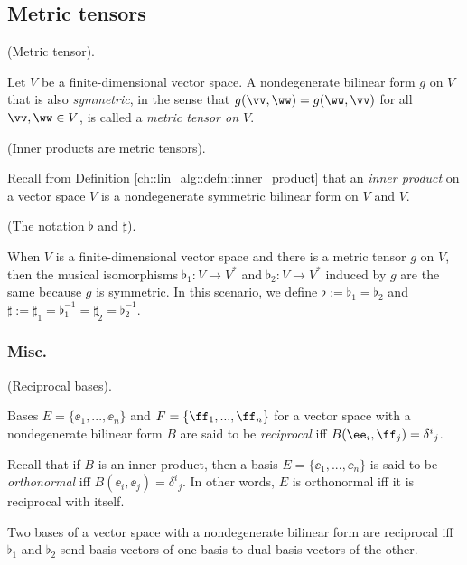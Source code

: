 \subsection*{Metric tensors}

\begin{defn}
    (Metric tensor).
    
    Let $V$ be a finite-dimensional vector space. A nondegenerate bilinear form $g$ on $V$ that is also \textit{symmetric}, in the sense that $g(\vv, \ww) = g(\ww, \vv)$ for all $\vv, \ww \in V$, is called a \textit{metric tensor on $V$}.
\end{defn}

\begin{remark}
    (Inner products are metric tensors).
    
    Recall from Definition     \ref{ch::lin_alg::defn::inner_product} that an \textit{inner product} on a vector space $V$ is a nondegenerate symmetric bilinear form on $V$ and $V$.
\end{remark}

\begin{defn}
    (The notation $\flat$ and $\sharp$).
    
    When $V$ is a finite-dimensional vector space and there is a metric tensor $g$ on $V$, then the musical isomorphisms ${\flat_1:V \rightarrow V^*}$ and ${\flat_2:V \rightarrow V^*}$ induced by $g$ are the same because $g$ is symmetric. In this scenario, we define $\flat := \flat_1 = \flat_2$ and $\sharp := \sharp_1 = \flat_1^{-1} = \sharp_2 = \flat_2^{-1}$.
\end{defn}

\subsubsection*{Misc.}

\begin{defn}
    (Reciprocal bases).

    Bases $E = \{\ee_1, ..., \ee_n\}$ and $F = \{\ff_1, ..., \ff_n\}$ for a vector space with a nondegenerate bilinear form $B$ are said to be \textit{reciprocal} iff $B(\ee_i, \ff_j) = \delta^i{}_j$.

    Recall that if $B$ is an inner product, then a basis $E = \{\ee_1, ..., \ee_n\}$ is said to be \textit{orthonormal} iff $B(\ee_i, \ee_j) = \delta^i{}_j$. In other words, $E$ is orthonormal iff it is reciprocal with itself.
\end{defn}

\begin{theorem}
    Two bases of a vector space with a nondegenerate bilinear form are reciprocal iff $\flat_1$ and $\flat_2$ send basis vectors of one basis to dual basis vectors of the other.
\end{theorem}


